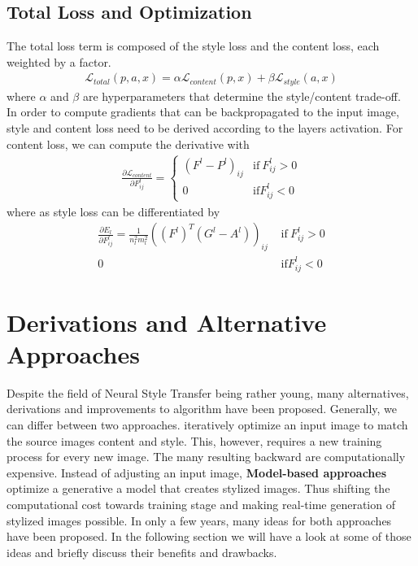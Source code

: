\documentclass{seminar}
\begin{document}
\subsection{Total Loss and Optimization}
The total loss term is composed of the style loss and the content loss, each weighted by a factor.
\begin{align*}
	\mathcal{L}_{total}(p, a, x) = \alpha \mathcal{L}_{content}(p,x) + \beta \mathcal{L}_{style}(a,x)
\end{align*}
where $\alpha$ and $\beta$ are hyperparameters that determine the style/content trade-off.\\
In order to compute gradients that can be backpropagated to the input image, style and content loss need to be derived according to the layers activation. For content loss, we can compute the derivative with
\begin{align*}
	\frac{\partial \mathcal{L}_{content}}{\partial F^l_{ij}} = 
	    \begin{cases}
	(F^l-P^l)_{ij} & \text{if}\ F^l_{ij} > 0 \\
	0 & \text{if} F^l_{ij} <0
	\end{cases}
\end{align*}
where as style loss can be differentiated by
\begin{align*}
	\frac{\partial E_l}{\partial F^l_{ij}} =
		\frac{1}{n_l^2m_l^2}((F^l)^T (G^l-A^l))_{ij} & \text{ if}\ F^l_{ij} > 0 \\
	0 & \text{ if} F^l_{ij} < 0
\end{align*}

\section{Derivations and Alternative Approaches}
Despite the field of Neural Style Transfer being rather young, many alternatives, derivations and improvements to \cite{gatys2015neural} algorithm have been proposed. Generally, we can differ between two approaches.  iteratively optimize an input image to match the source images content and style. This, however, requires a new training process for every new image. The many resulting backward are computationally expensive. Instead of adjusting an input image, \textbf{Model-based approaches} optimize a generative a model that creates stylized images. Thus shifting the computational cost towards training stage and making real-time generation of stylized images possible. In only a few years, many ideas for both approaches have been proposed.
In the following section we will have a look at some of those ideas and briefly discuss their benefits and drawbacks.
\end{document}
